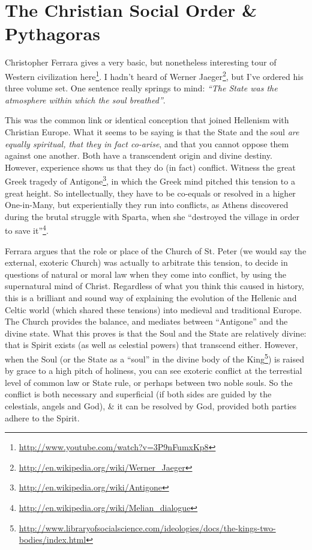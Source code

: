 \section{The Christian Social Order \& Pythagoras}

Christopher Ferrara gives a very basic, but nonetheless interesting tour of Western civilization here\footnote{\url{http://www.youtube.com/watch?v=3P9nFumxKp8}}. I hadn't heard of Werner Jaeger\footnote{\url{http://en.wikipedia.org/wiki/Werner\_Jaeger}}, but I've ordered his three volume set. One sentence really springs to mind: \emph{``The State was the atmosphere within which the soul breathed''}.

This was the common link or identical conception that joined Hellenism with Christian Europe. What it seems to be saying is that the State and the soul \emph{are equally spiritual, that they in fact co-arise}, and that you cannot oppose them against one another. Both have a transcendent origin and divine destiny. However, experience shows us that they do (in fact) conflict. Witness the great Greek tragedy of Antigone\footnote{\url{http://en.wikipedia.org/wiki/Antigone}}, in which the Greek mind pitched this tension to a great height. So intellectually, they have to be co-equals or resolved in a higher One-in-Many, but experientially they run into conflicts, as Athens discovered during the brutal struggle with Sparta, when she ``destroyed the village in order to save it''\footnote{\url{http://en.wikipedia.org/wiki/Melian\_dialogue}}.

Ferrara argues that the role or place of the Church of St. Peter (we would say the external, exoteric Church) was actually to arbitrate this tension, to decide in questions of natural or moral law when they come into conflict, by using the supernatural mind of Christ. Regardless of what you think this caused in history, this is a brilliant and sound way of explaining the evolution of the Hellenic and Celtic world (which shared these tensions) into medieval and traditional Europe. The Church provides the balance, and mediates between ``Antigone'' and the divine state. What this proves is that the Soul and the State are relatively divine: that is Spirit exists (as well as celestial powers) that transcend either. However, when the Soul (or the State as a ``soul'' in the divine body of the King\footnote{\url{http://www.libraryofsocialscience.com/ideologies/docs/the-kings-two-bodies/index.html}}) is raised by grace to a high pitch of holiness, you can see exoteric conflict at the terrestial level of common law or State rule, or perhaps between two noble souls. So the conflict is both necessary and superficial (if both sides are guided by the celestials, angels and God), \& it can be resolved by God, provided both parties adhere to the Spirit.

